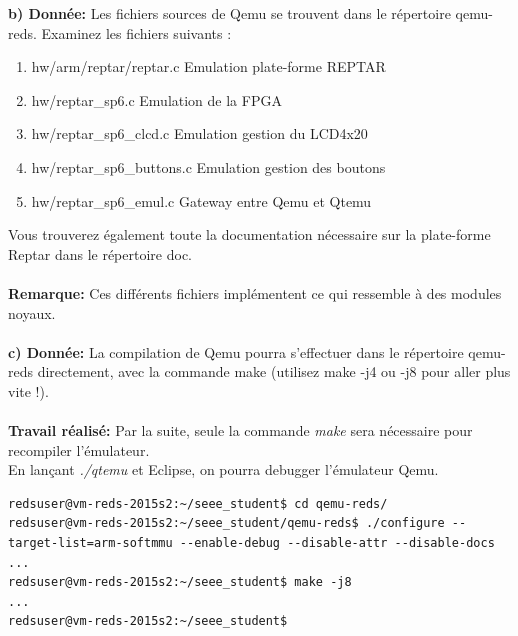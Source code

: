 \textbf{b) Donnée: }Les fichiers sources de Qemu se trouvent dans le répertoire qemu-reds. Examinez les fichiers
suivants :
\begin{enumerate}
	\item hw/arm/reptar/reptar.c Emulation plate-forme REPTAR
	\item hw/reptar\_sp6.c Emulation de la FPGA
	\item hw/reptar\_sp6\_clcd.c Emulation gestion du LCD4x20
	\item hw/reptar\_sp6\_buttons.c Emulation gestion des boutons
	\item hw/reptar\_sp6\_emul.c Gateway entre Qemu et Qtemu
\end{enumerate}
Vous trouverez également toute la documentation nécessaire sur la plate-forme Reptar dans le
répertoire doc. \\\\
\textbf{Remarque: }Ces différents fichiers implémentent ce qui ressemble à des modules noyaux.\\\\
\textbf{c) Donnée: } La compilation de Qemu pourra s'effectuer dans le répertoire qemu-reds directement, avec la
commande make (utilisez make -j4 ou -j8 pour aller plus vite !). \\\\
\textbf{Travail réalisé: }Par la suite, seule la commande \textit{make} sera nécessaire pour recompiler l'émulateur.\\
En lançant \textit{./qtemu} et Eclipse, on pourra debugger l'émulateur Qemu.
\begin{lstlisting}
redsuser@vm-reds-2015s2:~/seee_student$ cd qemu-reds/
redsuser@vm-reds-2015s2:~/seee_student/qemu-reds$ ./configure --target-list=arm-softmmu --enable-debug --disable-attr --disable-docs 
...
redsuser@vm-reds-2015s2:~/seee_student$ make -j8
...
redsuser@vm-reds-2015s2:~/seee_student$
\end{lstlisting}
